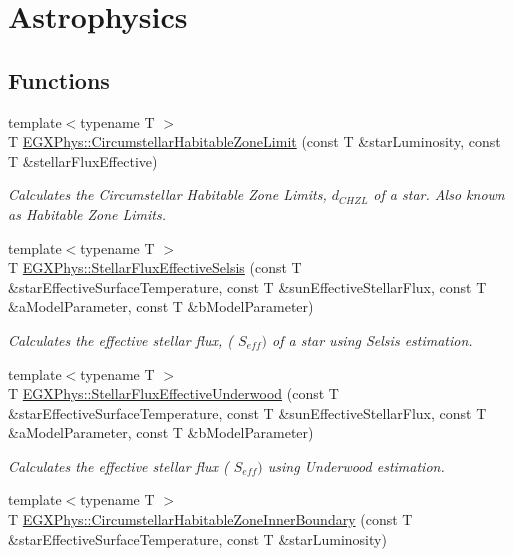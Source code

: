 \hypertarget{group___astrophysics}{}\section{Astrophysics}
\label{group___astrophysics}
\subsection*{Functions}
\begin{DoxyCompactItemize}
\item 
{\footnotesize template$<$typename T $>$ }\\T \hyperlink{group___astrophysics_ga23a8f602461ea3257e8767b1d455c383}{E\+G\+X\+Phys\+::\+Circumstellar\+Habitable\+Zone\+Limit} (const T \&star\+Luminosity, const T \&stellar\+Flux\+Effective)
\begin{DoxyCompactList}\small\item\em Calculates the Circumstellar Habitable Zone Limits, $d_{CHZL}$ of a star. Also known as Habitable Zone Limits. \end{DoxyCompactList}\item 
{\footnotesize template$<$typename T $>$ }\\T \hyperlink{group___astrophysics_ga3ce3a04fec7b1c8fb66ac54270ce3902}{E\+G\+X\+Phys\+::\+Stellar\+Flux\+Effective\+Selsis} (const T \&star\+Effective\+Surface\+Temperature, const T \&sun\+Effective\+Stellar\+Flux, const T \&a\+Model\+Parameter, const T \&b\+Model\+Parameter)
\begin{DoxyCompactList}\small\item\em Calculates the effective stellar flux, ( $S_{eff})$ of a star using Selsis estimation. \end{DoxyCompactList}\item 
{\footnotesize template$<$typename T $>$ }\\T \hyperlink{group___astrophysics_ga34d1e39bce17904bc6d383f1935c79d6}{E\+G\+X\+Phys\+::\+Stellar\+Flux\+Effective\+Underwood} (const T \&star\+Effective\+Surface\+Temperature, const T \&sun\+Effective\+Stellar\+Flux, const T \&a\+Model\+Parameter, const T \&b\+Model\+Parameter)
\begin{DoxyCompactList}\small\item\em Calculates the effective stellar flux ( $S_{eff})$ using Underwood estimation. \end{DoxyCompactList}\item 
{\footnotesize template$<$typename T $>$ }\\T \hyperlink{group___astrophysics_ga9ee2e8023cb444aa4638c962788b5853}{E\+G\+X\+Phys\+::\+Circumstellar\+Habitable\+Zone\+Inner\+Boundary} (const T \&star\+Effective\+Surface\+Temperature, const T \&star\+Luminosity)

\end{DoxyCompactItemize}

